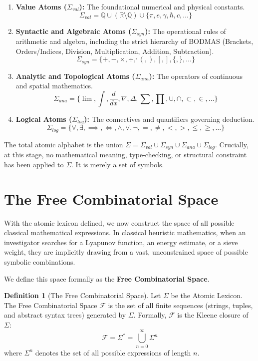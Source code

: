 \documentclass[12pt,openany]{extbook}
\theoremstyle{plain}
\theoremstyle{definition}
\newtheorem{definition}{Definition}[chapter]
\begin{document}
\begin{enumerate}
    \item \textbf{Value Atoms ($\Sigma_{val}$):} The foundational numerical and physical constants.
    \[
    \Sigma_{val} = \mathbb{Q} \cup (\mathbb{R} \setminus \mathbb{Q}) \cup \{\pi, e, \gamma, \hbar, c, \dots\}
    \]
    \item \textbf{Syntactic and Algebraic Atoms ($\Sigma_{syn}$):} The operational rules of arithmetic and algebra, including the strict hierarchy of BODMAS (Brackets, Orders/Indices, Division, Multiplication, Addition, Subtraction).
    \[
    \Sigma_{syn} = \{+, -, \times, \div, ^, (, ), [, ], \{, \}, \dots\}
    \]
    \item \textbf{Analytic and Topological Atoms ($\Sigma_{ana}$):} The operators of continuous and spatial mathematics.
    \[
    \Sigma_{ana} = \{\lim, \int, \frac{d}{dx}, \nabla, \Delta, \sum, \prod, \cup, \cap, \subset, \in, \dots\}
    \]
    \item \textbf{Logical Atoms ($\Sigma_{log}$):} The connectives and quantifiers governing deduction.
    \[
    \Sigma_{log} = \{\forall, \exists, \implies, \iff, \land, \lor, \neg, =, \neq, <, >, \leq, \geq, \dots\}
    \]
\end{enumerate}

The total atomic alphabet is the union $\Sigma = \Sigma_{val} \cup \Sigma_{syn} \cup \Sigma_{ana} \cup \Sigma_{log}$. Crucially, at this stage, no mathematical meaning, type-checking, or structural constraint has been applied to $\Sigma$. It is merely a set of symbols.

\section{The Free Combinatorial Space}

With the atomic lexicon defined, we now construct the space of all possible classical mathematical expressions. In classical heuristic mathematics, when an investigator searches for a Lyapunov function, an energy estimate, or a sieve weight, they are implicitly drawing from a vast, unconstrained space of possible symbolic combinations.

We define this space formally as the \textbf{Free Combinatorial Space}.

\begin{definition}[The Free Combinatorial Space]
Let $\Sigma$ be the Atomic Lexicon. The Free Combinatorial Space $\mathcal{F}$ is the set of all finite sequences (strings, tuples, and abstract syntax trees) generated by $\Sigma$. Formally, $\mathcal{F}$ is the Kleene closure of $\Sigma$:
\[
\mathcal{F} = \Sigma^* = \bigcup_{n=0}^{\infty} \Sigma^n
\]
where $\Sigma^n$ denotes the set of all possible expressions of length $n$.
\end{definition}
\end{document}
